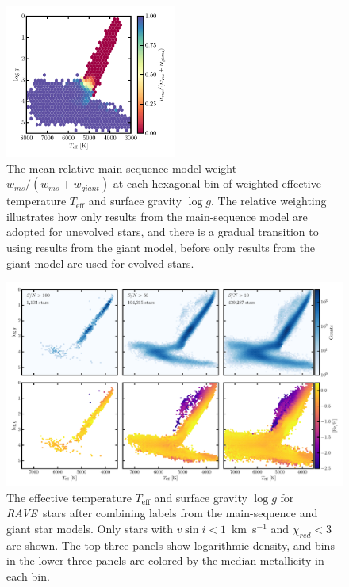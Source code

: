 \documentclass[preprint,trackchanges]{aastex}
\newcommand{\acronym}[1]{{\small{#1}}}
\newcommand{\project}[1]{\textsl{#1}}
\newcommand{\rave}{\project{\acronym{RAVE}}}
\newcommand{\teff}{T_{\mathrm{eff}}}
\newcommand{\logg}{\log g}
\begin{document}
\begin{figure}[p]
\center
\includegraphics[width=0.5\textwidth]{figures/model-weights.pdf}
\caption{The mean relative main-sequence model weight $w_{ms}/(w_{ms} + w_{giant})$ at each hexagonal bin of weighted effective temperature $\teff$ and surface gravity $\logg$.  The relative weighting illustrates how only results from the main-sequence model are adopted for unevolved stars, and there is a gradual transition to using results from the giant model, before only results from the giant model are used for evolved stars.\label{fig:model-weights}}
\end{figure}




\begin{figure}[p]
\includegraphics[width=\textwidth]{figures/hrd-test-set.pdf}
\caption{The effective temperature $\teff$ and surface gravity $\logg$ for \rave\ stars after combining labels from the main-sequence and giant star models.  Only stars with $v\sin{i} < 1$~km~s$^{-1}$ and $\chi_{red} < 3$ are shown.  The top three panels show logarithmic density, and bins in the lower three panels are colored by the median metallicity in each bin.\label{fig:test-set-hrd}}
\end{figure}
\end{document}
